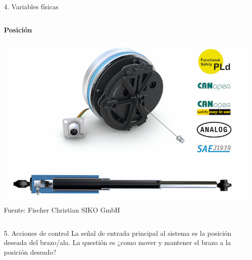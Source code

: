 \documentclass[presentation,aspectratio=169]{beamer}
\begin{document}
\begin{frame}[label={sec:org972f843}]{4. Variables físicas}
\begin{columns}
\begin{column}{0.7\columnwidth}
\textbf{Posición}
\begin{center}
\includegraphics[width=0.7\linewidth]{../../figures/PosSensor.png}\\
{\footnotesize Fuente: Fischer Christian SIKO GmbH}
\end{center}
\end{column}
\end{columns}
\end{frame}
\begin{frame}[label={sec:org0d152db}]{5. Acciones de control}
La señal de entrada principal al sistema es la posición deseada del brazo/ala. La questión es \alert{¿como mover y mantener el brazo a la posición deseado?}
\end{frame}
\end{document}
